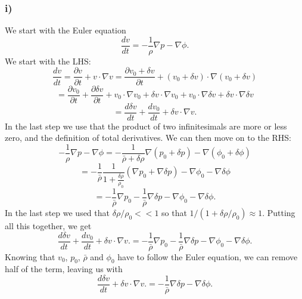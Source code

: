 \documentclass[a4paper,norsk, 10pt]{article}
\begin{document}
\subsubsection{i)}
We start with the Euler equation
\begin{equation}
\frac{dv}{dt} = - \frac{1}{\rho}\nabla p - \nabla \phi.
\end{equation}
We start with the LHS:
\begin{equation}
\frac{dv}{dt} = \frac{\partial v}{\partial t} + v\cdot \nabla v = \frac{\partial v_0 + \delta v}{\partial t} + (v_0 + \delta v)\cdot \nabla (v_0 + \delta v)
\end{equation}
\begin{equation}
= \frac{\partial v_0}{\partial t} + \frac{\partial \delta v}{\partial t} + v_0\cdot \nabla v_0 + \delta v\cdot \nabla v_0 + v_0\cdot \nabla \delta v + \delta v\cdot \nabla \delta v
\end{equation}
\begin{equation}
= \frac{d \delta v}{dt} + \frac{d v_0}{dt} + \delta v \cdot \nabla v.
\end{equation}
In the last step we use that the product of two infinitesimals are more or less zero, and the definition of total derivatives. We can then move on to the RHS:
\begin{equation}
-\frac{1}{\rho}\nabla p - \nabla \phi = -\frac{1}{\bar{\rho} + \delta \rho}\nabla (p_0 + \delta p) - \nabla (\phi_0 + \delta \phi)
\end{equation}
\begin{equation}
= -\frac{1}{\bar{\rho}}\frac{1}{1+\frac{\delta\rho}{\rho_0}}\left(\nabla p_0 + \nabla \delta p\right) - \nabla \phi_0 - \nabla \delta \phi
\end{equation}
\begin{equation}
= -\frac{1}{\bar{\rho}}\nabla p_0 -\frac{1}{\bar{\rho}}\nabla \delta p - \nabla \phi_0 - \nabla \delta \phi.
\end{equation}
In the last step we used that $\delta \rho / \rho_0 << 1$ so that $1/(1+\delta \rho / \rho_0) \approx 1$. Putting all this together, we get
\begin{equation}
\frac{d \delta v}{dt} + \frac{d v_0}{dt} + \delta v \cdot \nabla v. = -\frac{1}{\bar{\rho}}\nabla p_0 -\frac{1}{\bar{\rho}}\nabla \delta p - \nabla \phi_0 - \nabla \delta \phi.
\end{equation}
Knowing that $v_0$, $p_0$, $\bar{\rho}$ and $\phi_0$ have to follow the Euler equation, we can remove half of the term, leaving us with
\begin{equation}
\frac{d \delta v}{dt} + \delta v \cdot \nabla v. =  -\frac{1}{\bar{\rho}}\nabla \delta p  - \nabla \delta \phi.
\end{equation}
\end{document}
